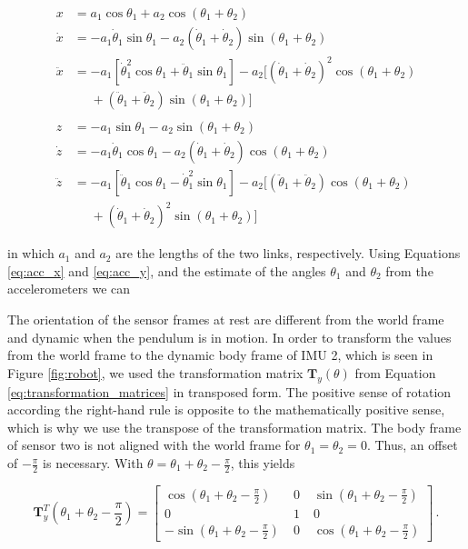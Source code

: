 \begin{align}
  x &= a_1 \cos \theta_1 + a_2 \cos(\theta_1 + \theta_2) \\
  \dot{x} &= -a_1 \dot{\theta}_1 \sin \theta_1  - a_2 (\dot{\theta}_1 + \dot{\theta}_2) \sin(\theta_1 + \theta_2) \\
  \ddot{x} {}&= -a_1 [\dot{\theta}^2_1 \cos \theta_1 + \ddot{\theta}_1 \sin \theta_1] - a_2 [(\dot{\theta}_1 + \dot{\theta}_2)^2 \cos(\theta_1 + \theta_2) \nonumber \\ 
  &\mathrel{\phantom{=}} + (\ddot{\theta}_1 + \ddot{\theta}_2) \sin(\theta_1 + \theta_2)] \label{eq:acc_x} \\
  \nonumber \\
  z &= -a_1 \sin \theta_1 - a_2 \sin(\theta_1 + \theta_2) \\
  \dot{z} &= -a_1 \dot{\theta}_1 \cos \theta_1  - a_2 (\dot{\theta}_1 + \dot{\theta}_2) \cos(\theta_1 + \theta_2) \\
  \ddot{z} {}&= -a_1 [\ddot{\theta}_1 \cos \theta_1 - \dot{\theta}^2_1 \sin \theta_1] - a_2 [(\ddot{\theta}_1 + \ddot{\theta}_2) \cos(\theta_1 + \theta_2) \nonumber \\ 
  &\mathrel{\phantom{=}} + (\dot{\theta}_1 + \dot{\theta}_2)^2 \sin(\theta_1 + \theta_2)] \label{eq:acc_y}
\end{align}

\noindent
in which $a_1$ and $a_2$ are the lengths of the two links, respectively. Using Equations \ref{eq:acc_x} and \ref{eq:acc_y}, and the estimate of the angles $\theta_1$ and $\theta_2$ from the accelerometers we can 

The orientation of the sensor frames at rest are different from the world frame and dynamic when the pendulum is in motion. In order to transform the values from the world frame to the dynamic body frame of \gls{IMU} 2, which is seen in Figure \ref{fig:robot}, we used the transformation matrix $\mathbf{T}_y(\theta)$ from Equation \ref{eq:transformation_matrices} in transposed form. The positive sense of rotation according the right-hand rule is opposite to the mathematically positive sense, which is why we use the transpose of the transformation matrix. The body frame of sensor two is not aligned with the world frame for $\theta_1 = \theta_2 = 0$. Thus, an offset of $-\frac{\pi}{2}$ is necessary. With $\theta = \theta_1 + \theta_2 - \frac{\pi}{2}$, this yields

\begin{equation}
\mathbf{T}^T_y(\theta_1 + \theta_2 - \frac{\pi}{2}) = \begin{bmatrix}
    \cos (\theta_1 + \theta_2 - \frac{\pi}{2}) \; & 0 \; & \sin (\theta_1 + \theta_2 - \frac{\pi}{2}) \\
    0 \; & 1 \; & 0 \\
    -\sin (\theta_1 + \theta_2 - \frac{\pi}{2}) \; & 0 \; & \cos (\theta_1 + \theta_2 - \frac{\pi}{2})
    \end{bmatrix}\,.
\end{equation}

